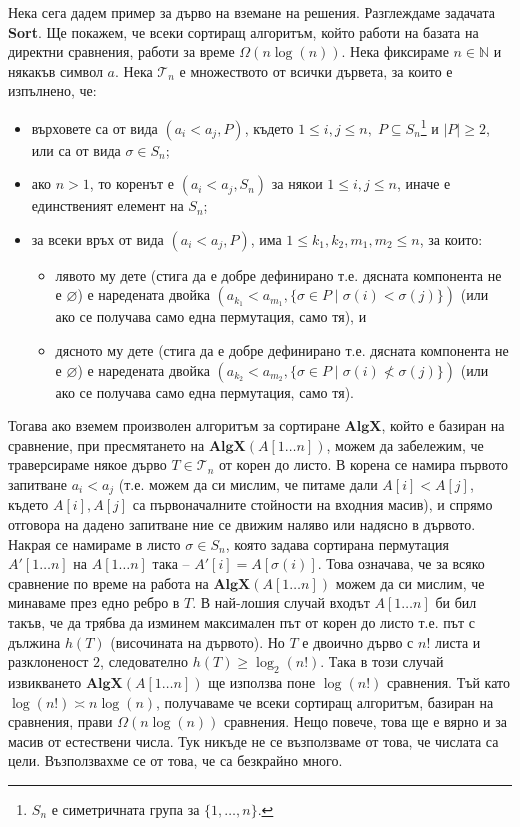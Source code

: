 \documentclass{article}
\newcommand{\N}{\mathbb{N}}
\newcommand{\calT}{\mathcal{T}}
\theoremstyle{definition}
\theoremstyle{plain}
\theoremstyle{remark}
\theoremstyle{definition}
\begin{document}
Нека сега дадем пример за дърво на вземане на решения.
Разглеждаме задачата \textbf{Sort}.
Ще покажем, че всеки сортиращ алгоритъм, който работи на базата на директни сравнения, работи за време $\Omega(n \log (n))$.
Нека фиксираме $n \in \N$ и някакъв символ $a$.
Нека $\calT_n$ е множеството от всички дървета, за които е изпълнено, че:
\begin{itemize}
    \item върховете са от вида $(a_i < a_j, P)$, където $1 \leq i, j \leq n, \; P \subseteq S_n$\footnote{$S_n$ е симетричната група за $\{ 1, \dots, n \}$.} и $|P| \geq 2$, или са от вида $\sigma \in S_n$;
    \item ако $n > 1$, то коренът е $(a_i < a_j, S_n)$ за някои $1 \leq i, j \leq n$, иначе е единственият елемент на $S_n$;
    \item за всеки връх от вида $(a_i < a_j, P)$, има $1 \leq k_1, k_2, m_1, m_2 \leq n$, за които:
          \begin{itemize}
              \item лявото му дете (стига да е добре дефинирано т.е. дясната компонента не е $\varnothing$) е наредената двойка $(a_{k_1} < a_{m_1}, \{ \sigma \in P \mid \sigma(i) < \sigma(j) \})$ (или ако се получава само една пермутация, само тя), и
              \item дясното му дете (стига да е добре дефинирано т.е. дясната компонента не е $\varnothing$) е наредената двойка $(a_{k_2} < a_{m_2}, \{ \sigma \in P \mid \sigma(i) \not< \sigma(j) \})$ (или ако се получава само една пермутация, само тя).
          \end{itemize}
\end{itemize}
Тогава ако вземем произволен алгоритъм за сортиране $\mathbf{AlgX}$, който е базиран на сравнение, при пресмятането на $\mathbf{AlgX}(A[1 \dots n])$, можем да забележим, че траверсираме някое дърво $T \in \calT_n$ от корен до листо.
В корена се намира първото запитване $a_i < a_j$ (т.е. можем да си мислим, че питаме дали $A[i] < A[j]$, където $A[i], A[j]$ са първоначалните стойности на входния масив), и спрямо отговора на дадено запитване ние се движим наляво или надясно в дървото.
Накрая се намираме в листо $\sigma \in S_n$, която задава сортирана пермутация $A'[1 \dots n]$ на $A[1 \dots n]$ така -- $A'[i] = A[\sigma(i)]$.
Това означава, че за всяко сравнение по време на работа на $\mathbf{AlgX}(A[1 \dots n])$ можем да си мислим, че минаваме през едно ребро в $T$.
В най-лошия случай входът $A[1 \dots n]$ би бил такъв, че да трябва да изминем максимален път от корен до листо т.е. път с дължина $h(T)$ (височината на дървото).
Но $T$ е двоично дърво с $n!$ листа и разклоненост $2$, следователно $h(T) \geq \log_2(n!)$.
Така в този случай извикването $\mathbf{AlgX}(A[1 \dots n])$ ще използва поне $\log(n!)$ сравнения.
Тъй като $\log(n!) \asymp n \log(n)$, получаваме че всеки сортиращ алгоритъм, базиран на сравнения, прави $\Omega(n \log(n))$ сравнения.
Нещо повече, това ще е вярно и за масив от естествени числа.
Тук никъде не се възползваме от това, че числата са цели.
Възползвахме се от това, че са безкрайно много.
\end{document}
